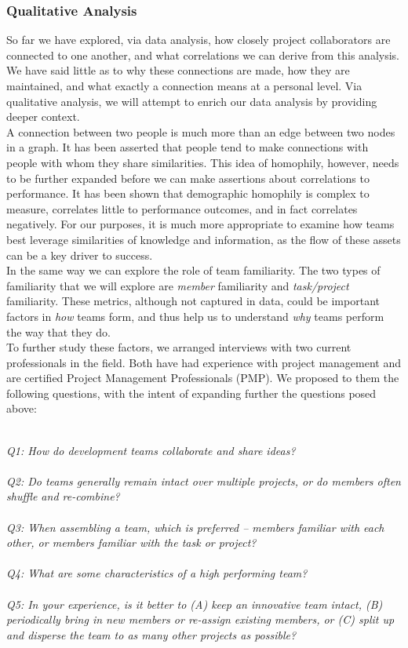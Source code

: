 \documentclass{proc}
\begin{document}
\subsubsection{Qualitative Analysis}
So far we have explored, via data analysis, how closely project collaborators are connected to one another, and what correlations we can derive from this analysis. We have said little as to why these connections are made, how they are maintained, and what exactly a connection means at a personal level. Via qualitative analysis, we will attempt to enrich our data analysis by providing deeper context.\\
A connection between two people is much more than an edge between two nodes in a graph. It has been asserted that people tend to make connections with people with whom they share similarities\cite{mcpherson2001birds}. This idea of homophily, however, needs to be further expanded before we can make assertions about correlations to performance. It has been shown that demographic homophily is complex to measure, correlates little to performance outcomes, and in fact correlates negatively\cite{reagans2004make,lawrence1997perspective}. For our purposes, it is much more appropriate to examine how teams best leverage similarities of knowledge and information, as the flow of these assets can be a key driver to success\cite{nissen2002extended}.\\
In the same way we can explore the role of team familiarity. The two types of familiarity that we will explore are \textit{member} familiarity and \textit{task/project} familiarity\cite{harrison2003time}. These metrics, although not captured in data, could be important factors in \textit{how} teams form, and thus help us to understand \textit{why} teams perform the way that they do.\\

To further study these factors, we arranged interviews with two current professionals in the field. Both have had experience with project management and are certified Project Management Professionals (PMP\textregistered). We proposed to them the following questions, with the intent of expanding further the questions posed above:

\noindent\\\textit{Q1: How do development teams collaborate and share ideas?}\\
\noindent\\\textit{Q2: Do teams generally remain intact over multiple projects, or do members often shuffle and re-combine?}\\
\noindent\\\textit{Q3: When assembling a team, which is preferred -- members familiar with each other, or members familiar with the task or project?}\\
\noindent\\\textit{Q4: What are some characteristics of a high performing team?}\\
\noindent\\\textit{Q5: In your experience, is it better to (A) keep an innovative team intact, (B) periodically bring in new members or re-assign existing members, or (C) split up and disperse the team to as many other projects as possible?}\\
\end{document}
